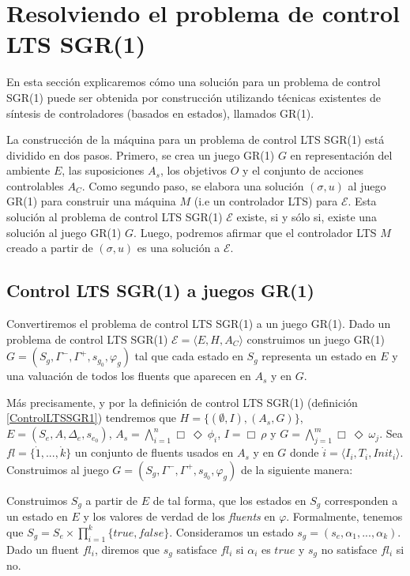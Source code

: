 \section{Resolviendo el problema de control LTS SGR(1)}

En esta sección explicaremos cómo una solución para un problema de control SGR(1) puede ser obtenida por construcción
utilizando técnicas existentes de síntesis de controladores (basados en estados), llamados GR(1). \cite{Piterman}

La construcción de la máquina para un problema de control LTS SGR(1) está dividido en dos pasos. Primero, se crea un juego GR(1)
$G$ en representación del ambiente $E$, las suposiciones $A_s$, los objetivos $O$ y el conjunto de acciones controlables
$A_C$. Como segundo paso, se elabora una solución $(\sigma,u)$ al juego GR(1) para construir una máquina $M$ (i.e un
controlador LTS) para $\mathcal{E}$. Esta solución al problema de control LTS SGR(1) $\mathcal{E}$ existe, si y sólo si,
existe una solución al juego GR(1) $G$. Luego, podremos afirmar que el controlador LTS $M$ creado a partir de
$(\sigma,u)$ es una solución a $\mathcal{E}$.

\subsection{Control LTS SGR(1) a juegos GR(1)}

Convertiremos el problema de control LTS SGR(1) a un juego GR(1). Dado un problema de control LTS SGR(1) $\mathcal{E} =
\langle E,H,A_C\rangle$ construimos un juego GR(1) $G = (S_g,\Gamma^-,\Gamma^+,s_{g_0},\varphi_g)$ tal que cada estado en $S_g$
representa un estado en $E$ y una valuación de todos los fluents que aparecen en $A_s$ y en $G$.

Más precisamente, y por la definición de control LTS SGR(1) (definición \ref{ControlLTSSGR1}) tendremos que $H =
\{(\emptyset,I),(A_s,G)\}$, $E = (S_e,A,\Delta_e,s_{e_0})$, $A_s = \bigwedge_{i=1}^n\Box\ \Diamond\ \phi_i$, $I = \Box\
\rho$ y $G = \bigwedge_{j=1}^m\Box\ \Diamond\ \omega_j$. Sea $fl = \{\dot1,...,\dot k\}$ un conjunto de fluents usados en
$A_s$ y en $G$ donde $\dot i = \langle I_i,T_i,Init_i\rangle$. Construimos al juego $G = (S_g,\Gamma^-,\Gamma^+,s_{g_0},\varphi_g)$ de
la siguiente manera:

Construimos $S_g$ a partir de $E$ de tal forma, que los estados en $S_g$ corresponden a un estado en $E$ y los valores
de verdad de los \emph{fluents} en $\varphi$. Formalmente, tenemos que  $S_g = S_e \times \prod_{i=1}^k\{true,false\}$.
Consideramos un estado $s_g = (s_e,\alpha_1,...,\alpha_k)$. Dado un fluent $fl_i$, diremos que $s_g$ satisface $fl_i$ si
$\alpha_i$ es $true$ y $s_g$ no satisface $fl_i$ si no. 

